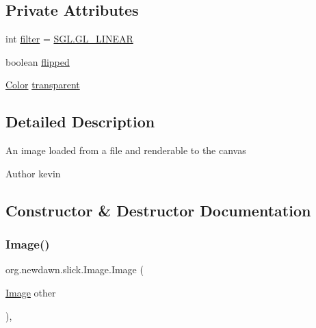\subsection*{Private Attributes}
\begin{DoxyCompactItemize}
\item 
int \mbox{\hyperlink{classorg_1_1newdawn_1_1slick_1_1_image_a1c6f09687817420f3762f32bb1c3ed76}{filter}} = \mbox{\hyperlink{interfaceorg_1_1newdawn_1_1slick_1_1opengl_1_1renderer_1_1_s_g_l_a8324736c2426087b7057fb3c6810b9b2}{S\+G\+L.\+G\+L\+\_\+\+L\+I\+N\+E\+AR}}
\item 
boolean \mbox{\hyperlink{classorg_1_1newdawn_1_1slick_1_1_image_a45ebd330142d5ca956f6634158971ab0}{flipped}}
\item 
\mbox{\hyperlink{classorg_1_1newdawn_1_1slick_1_1_color}{Color}} \mbox{\hyperlink{classorg_1_1newdawn_1_1slick_1_1_image_a3da3000703612fcb8595be3408c91757}{transparent}}
\end{DoxyCompactItemize}


\subsection{Detailed Description}
An image loaded from a file and renderable to the canvas

\begin{DoxyAuthor}{Author}
kevin 
\end{DoxyAuthor}


\subsection{Constructor \& Destructor Documentation}
\mbox{\label{classorg_1_1newdawn_1_1slick_1_1_image_a06e4c2fc918090322e8d00b09eeaba9c}} 
\subsubsection{\texorpdfstring{Image()}{Image()}\hspace{0.1cm}{\footnotesize\ttfamily [1/16]}}
{\footnotesize\ttfamily org.\+newdawn.\+slick.\+Image.\+Image (\begin{DoxyParamCaption}\item[{\mbox{\hyperlink{classorg_1_1newdawn_1_1slick_1_1_image}{Image}}}]{other }\end{DoxyParamCaption})\hspace{0.3cm}{\ttfamily [inline]}, {\ttfamily [protected]}}

